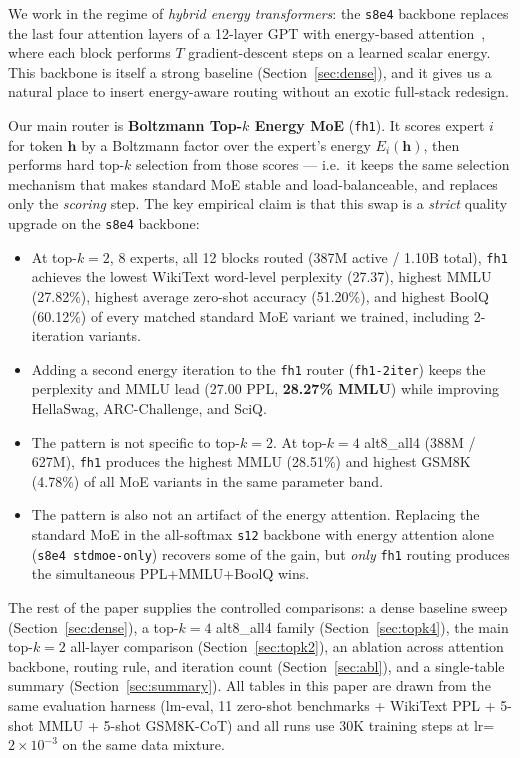 \documentclass[oneside]{article}
\begin{document}
We work in the regime of \emph{hybrid energy transformers}: the \texttt{s8e4} backbone replaces the last four attention layers of a 12-layer GPT with energy-based attention~\citep{lecun2006tutorial,du2019implicit}, where each block performs $T$ gradient-descent steps on a learned scalar energy. This backbone is itself a strong baseline (Section~\ref{sec:dense}), and it gives us a natural place to insert energy-aware routing without an exotic full-stack redesign.

Our main router is \textbf{Boltzmann Top-$k$ Energy MoE} (\texttt{fh1}). It scores expert $i$ for token $\mathbf{h}$ by a Boltzmann factor over the expert's energy $E_i(\mathbf{h})$, then performs hard top-$k$ selection from those scores --- i.e.\ it keeps the same selection mechanism that makes standard MoE stable and load-balanceable, and replaces only the \emph{scoring} step. The key empirical claim is that this swap is a \emph{strict} quality upgrade on the \texttt{s8e4} backbone:

\begin{itemize}[leftmargin=1.5em]
  \item At top-$k=2$, 8 experts, all 12 blocks routed (387M active / 1.10B total), \texttt{fh1} achieves the lowest WikiText word-level perplexity (27.37), highest MMLU (27.82\%), highest average zero-shot accuracy (51.20\%), and highest BoolQ (60.12\%) of every matched standard MoE variant we trained, including 2-iteration variants.
  \item Adding a second energy iteration to the \texttt{fh1} router (\texttt{fh1-2iter}) keeps the perplexity and MMLU lead (27.00 PPL, \textbf{28.27\% MMLU}) while improving HellaSwag, ARC-Challenge, and SciQ.
  \item The pattern is not specific to top-$k=2$. At top-$k=4$ alt8\_all4 (388M / 627M), \texttt{fh1} produces the highest MMLU (28.51\%) and highest GSM8K (4.78\%) of all MoE variants in the same parameter band.
  \item The pattern is also not an artifact of the energy attention. Replacing the standard MoE in the all-softmax \texttt{s12} backbone with energy attention alone (\texttt{s8e4 stdmoe-only}) recovers some of the gain, but \emph{only} \texttt{fh1} routing produces the simultaneous PPL+MMLU+BoolQ wins.
\end{itemize}

The rest of the paper supplies the controlled comparisons: a dense baseline sweep (Section~\ref{sec:dense}), a top-$k=4$ alt8\_all4 family (Section~\ref{sec:topk4}), the main top-$k=2$ all-layer comparison (Section~\ref{sec:topk2}), an ablation across attention backbone, routing rule, and iteration count (Section~\ref{sec:abl}), and a single-table summary (Section~\ref{sec:summary}). All tables in this paper are drawn from the same evaluation harness (lm-eval, 11 zero-shot benchmarks + WikiText PPL + 5-shot MMLU + 5-shot GSM8K-CoT) and all runs use 30K training steps at lr=$2\times10^{-3}$ on the same data mixture.
\end{document}
